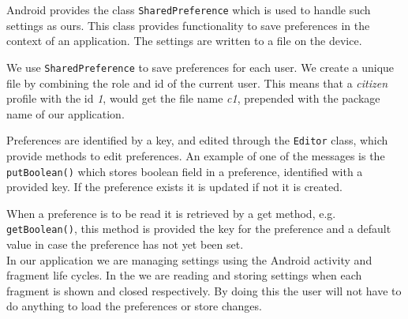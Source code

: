 Android provides the class \lstinline|SharedPreference| which is used to handle such settings as ours.
This class provides functionality to save preferences in the context of an application.
The settings are written to a file on the device.

We use \lstinline|SharedPreference| to save preferences for each user. We create a unique file by combining the role and id of the current user.
This means that a \textit{citizen} profile with the id \textit{1}, would get the file name \textit{c1}, prepended with the package name of our application.

Preferences are identified by a key, and edited through the \lstinline|Editor| class, which provide methods to edit preferences.
An example of one of the messages is the \lstinline!putBoolean()! which stores boolean field in a preference, identified with a provided key.
If the preference exists it is updated if not it is created.

When a preference is to be read it is retrieved by a get method, e.g. \lstinline!getBoolean()!, this method is provided the key for the preference and a default value in case the preference has not yet been set.\\

In our application we are managing settings using the Android activity and fragment life cycles.
In the \settingsactivity we are reading and storing settings when each fragment is shown and closed respectively. By doing this the user will not have to do anything to load the preferences or store changes.